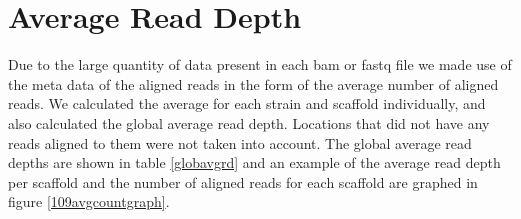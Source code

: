\documentclass[12pt]{article}
\begin{document}
\section{Average Read Depth}
	Due to the large quantity of data present in each bam or fastq file we made use of the meta data of the aligned reads in the form of the average number of aligned reads. We calculated the average for each strain and scaffold individually, and also calculated the global average read depth. Locations that did not have any reads aligned to them were not taken into account. The global average read depths are shown in table \ref{globavgrd} and an example of the average read depth per scaffold and the number of aligned reads for each scaffold are graphed in figure \ref{109avgcountgraph}.
\begin{table}[H]
	\begin{center}
		 \label{globavgrd}
		\vspace{0.5cm}
	\end{center}
\end{table}
\end{document}

